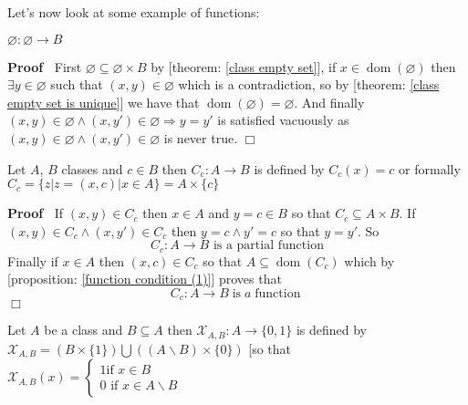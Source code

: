 \documentclass{book}
\newcommand{\tmop}[1]{\ensuremath{\operatorname{#1}}}
\newenvironment{proof}{\noindent\textbf{Proof\ }}{\hspace*{\fill}$\Box$\medskip}
\begin{document}
Let's now look at some example of functions:

\begin{example}
  \label{function empty function}$\varnothing : \varnothing \rightarrow B$
\end{example}

\begin{proof}
  First $\varnothing \subseteq \varnothing \times B$ by [theorem: \ref{class
  empty set}], if $x \in \tmop{dom} (\varnothing)$ then $\exists y \in
  \varnothing$ such that $(x, y) \in \varnothing$ which is a contradiction, so
  by [theorem: \ref{class empty set is unique}] we have that $\tmop{dom}
  (\varnothing) = \varnothing$. And finally $(x, y) \in \varnothing \wedge (x,
  y') \in \varnothing \Rightarrow y = y'$ is satisfied vacuously as $(x, y)
  \in \varnothing \wedge (x, y') \in \varnothing$ is never true. 
\end{proof}

\begin{example}
  \label{function constant function}Let $A$, $B$ classes and $c \in B$ then
  $C_c : A \rightarrow B$ is defined by $C_c (x) = c$ or formally $C_c = \{
  z|z = (x, c) |x \in A \} = A \times \{ c \}$
\end{example}

\begin{proof}
  If $(x, y) \in C_c$ then $x \in A$ and $y = c \in B$ so that $C_c \subseteq
  A \times B$. If $(x, y) \in C_c \wedge (x, y') \in C_c$ then $y = c \wedge
  y' = c$ so that $y = y'$. So
  \[ C_c : A \rightarrow B \text{ is a partial function} \]
  Finally if $x \in A$ then $(x, c) \in C_c$ so that $A \subseteq \tmop{dom}
  (C_c)$ which by [proposition: \ref{function condition (1)}] proves that
  \[ C_c : A \rightarrow B \tmop{is} a \tmop{function} \]
\end{proof}

\begin{example}
  \label{function characteristics function}Let $A$ be a class and $B \subseteq
  A$ then $\mathcal{X}_{A, B} : A \rightarrow \{ 0, 1 \}$ is defined by
  $\mathcal{X}_{A, B} = (B \times \{ 1 \}) \bigcup ((A\backslash B) \times \{
  0 \})$ [so that $\mathcal{X}_{A, B} (x) = \left\{\begin{array}{l}
    1 \text{if } x \in B\\
    0 \text{ if } x \in A\backslash B
  \end{array}\right.$
\end{example}
\end{document}
